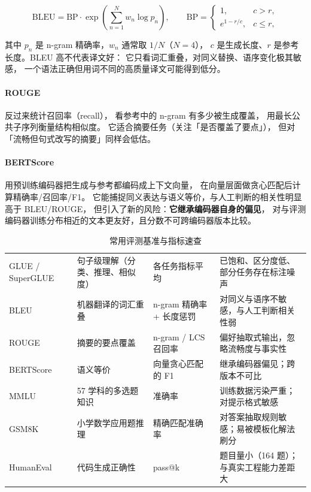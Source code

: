 \begin{equation}
\text{BLEU} = \text{BP} \cdot \exp\!\left( \sum_{n=1}^{N} w_n \log p_n \right),
\qquad \text{BP} = \begin{cases} 1, & c > r, \\ e^{1 - r/c}, & c \le r, \end{cases}
\label{eq:bleu}
\end{equation}

其中 $p_n$ 是 n-gram 精确率，$w_n$ 通常取 $1/N$（$N = 4$），
$c$ 是生成长度、$r$ 是参考长度。BLEU 高不代表译文好：
它只看词汇重叠，对同义替换、语序变化极其敏感，
一个语法正确但用词不同的高质量译文可能得到低分。

\paragraph{ROUGE} 反过来统计召回率（recall），
 看参考中的 n-gram 有多少被生成覆盖，
 用最长公共子序列衡量结构相似度。
它适合摘要任务（关注「是否覆盖了要点」），
但对「流畅但句式改写的摘要」同样会低估。

\paragraph{BERTScore} 用预训练编码器把生成与参考都编码成上下文向量，
在向量层面做贪心匹配后计算精确率/召回率/F1。
它能捕捉同义表达与语义等价，与人工判断的相关性明显高于 BLEU/ROUGE，
但引入了新的风险：\textbf{它继承编码器自身的偏见}，
对与评测编码器训练分布相近的文本更友好，且分数不可跨编码器版本比较。

\begin{table}[htbp]
\centering
\caption{常用评测基准与指标速查}
\label{tab:benchmarks}
\small
\begin{tabularx}{\textwidth}{L{2.1cm} L{1.9cm} L{1.7cm} Y}
\toprule
{} &  &  &  \\
\midrule
GLUE / SuperGLUE & 句子级理解（分类、推理、相似度） & 各任务指标平均 & 已饱和、区分度低、部分任务存在标注噪声 \\
\addlinespace
BLEU & 机器翻译的词汇重叠 & n-gram 精确率 + 长度惩罚 & 对同义与语序不敏感，与人工判断相关性弱 \\
\addlinespace
ROUGE & 摘要的要点覆盖 & n-gram / LCS 召回率 & 偏好抽取式输出，忽略流畅度与事实性 \\
\addlinespace
BERTScore & 语义等价 & 向量贪心匹配的 F1 & 继承编码器偏见；跨版本不可比 \\
\addlinespace
MMLU & 57 学科的多选题知识 & 准确率 & 训练数据污染严重；对提示格式敏感 \\
\addlinespace
GSM8K & 小学数学应用题推理 & 精确匹配准确率 & 对答案抽取规则敏感；易被模板化解法刷分 \\
\addlinespace
HumanEval & 代码生成正确性 & pass@k & 题目量小（164 题）；与真实工程能力差距大 \\
\bottomrule
\end{tabularx}
\end{table}

